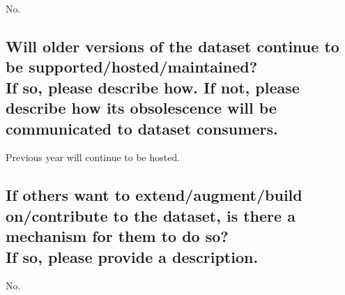 \documentclass[letterpaper, 10 pt, conference]{ieeeconf}  %
\newcommand{\subtitle}[1]{{\\ \small \normalfont \color{purple} #1}}
\begin{document}
No.

\subsection{Will older versions of the dataset continue to be supported/hosted/maintained? \subtitle{If so, please describe how. If not, please describe how its obsolescence will be communicated to dataset consumers. }}

Previous year will continue to be hosted.

\subsection{If others want to extend/augment/build on/contribute to the dataset, is there a mechanism for them to do so? \subtitle{If so, please provide a description.}}

No.

\medskip
 
  

\end{document}
